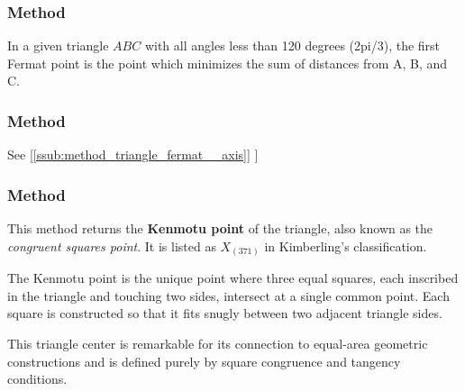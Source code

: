 \subsubsection{Method }
\label{ssub:method_triangle_first_fermat_point}
In a given triangle $ABC$ with all angles less than  120 degrees (2pi/3), the first Fermat point  is the point  which minimizes the sum of distances from A, B, and C.


\begin{tkzexample}[latex=.5\textwidth]
\end{tkzexample}

\subsubsection{Method }
\label{ssub:method_triangle_second__fermat__point}
See  [\ref{ssub:method_triangle_fermat__axis}]
]

\subsubsection{Method }
\label{ssub:_triangle_kenmotu__point}

This method returns the \textbf{Kenmotu point} of the triangle, also known as the \emph{congruent squares point}. It is listed as $X_{(371)}$ in Kimberling’s classification.

\medskip

The Kenmotu point is the unique point where three equal squares, each inscribed in the triangle and touching two sides, intersect at a single common point. Each square is constructed so that it fits snugly between two adjacent triangle sides.

\medskip

This triangle center is remarkable for its connection to equal-area geometric constructions and is defined purely by square congruence and tangency conditions.

